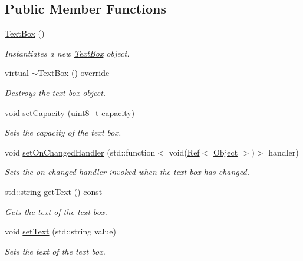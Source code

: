 \subsection*{Public Member Functions}
\begin{DoxyCompactItemize}
\item 
\mbox{\hyperlink{class_text_box_a25b67e5ff6788c60b8aef3f3540879d0}{Text\+Box}} ()
\begin{DoxyCompactList}\small\item\em Instantiates a new \mbox{\hyperlink{class_text_box}{Text\+Box}} object. \end{DoxyCompactList}\item 
virtual \mbox{\hyperlink{class_text_box_ae49e0bebccce519f007fb8edaf9228b3}{$\sim$\+Text\+Box}} () override
\begin{DoxyCompactList}\small\item\em Destroys the text box object. \end{DoxyCompactList}\item 
void \mbox{\hyperlink{class_text_box_a929abf1c11ac0ae54b1c3b0c300450d7}{set\+Capacity}} (uint8\+\_\+t capacity)
\begin{DoxyCompactList}\small\item\em Sets the capacity of the text box. \end{DoxyCompactList}\item 
void \mbox{\hyperlink{class_text_box_ac722a34fe2f513f5ea9596d4f34d67fd}{set\+On\+Changed\+Handler}} (std\+::function$<$ void(\mbox{\hyperlink{class_ref}{Ref}}$<$ \mbox{\hyperlink{class_object}{Object}} $>$)$>$ handler)
\begin{DoxyCompactList}\small\item\em Sets the on changed handler invoked when the text box has changed. \end{DoxyCompactList}\item 
std\+::string \mbox{\hyperlink{class_text_box_a43eb76f2ff7db001766ab9c0096e334d}{get\+Text}} () const
\begin{DoxyCompactList}\small\item\em Gets the text of the text box. \end{DoxyCompactList}\item 
void \mbox{\hyperlink{class_text_box_a678d90393851e2aab906e53a6762d4a6}{set\+Text}} (std\+::string value)
\begin{DoxyCompactList}\small\item\em Sets the text of the text box. \end{DoxyCompactList}\item 

\end{DoxyCompactItemize}
